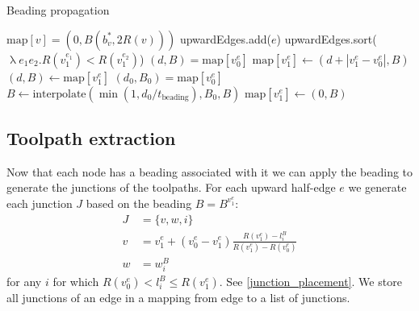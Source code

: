 \begin{algorithm}
\caption{Beading propagation}
\label{alg_beading_propagation}
\begin{algorithmic}
	 $\text{map}[v] = (0, B(b^*_v, 2 R(v)))$ \EndIf
\EndFor
{}
		upwardEdges.add($e$)
	\EndIf
\EndFor
\State upwardEdges.sort($\uplambda e_1 e_2 . R(v_1^{e_1}) < R(v_1^{e_2})$) 
 
    		\State $(d, B) = \text{map}[v_0^e]$
    		\State $\text{map}[v_1^e] \leftarrow (d + |v_1^e - v_0^e|, B)$
	\EndIf
\EndFor
{} 
    		\State $(d, B) \leftarrow \text{map}[v_1^e]$
    			\State $(d_0, B_0) = \text{map}[v_0^e]$
    			\State $B \leftarrow \text{interpolate}(\min(1, d_0 /  t_\text{beading}), B_0, B)$
    		\EndIf
    		\State $\text{map}[v_1^e] \leftarrow (0, B)$
	\EndIf
\EndFor
\end{algorithmic}
\end{algorithm}
















\subsection{Toolpath extraction}\label{sec_toolpath_extraction}
Now that each node has a beading associated with it we can apply the beading to generate the junctions of the toolpaths.
For each upward half-edge $e$ we generate each junction $J$ based on the beading $B = B^{v_1^e}$:
\begin{align*}
J &= \{ v, w, i \} \\ 
v &= v_1^e + (v_0^e - v_1^e) \frac{R(v_1^e) - l_i^B}{R(v_1^e) - R(v_0^e)} \\ 
w &= w_i^B
\end{align*}
for any $i$ for which $R(v_0^e) < l_i^B \leq R(v_1^e)$.
See \cref{junction_placement}.
We store all junctions of an edge in a mapping from edge to a list of junctions.


